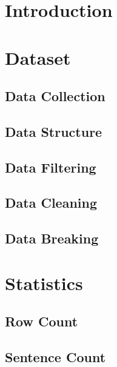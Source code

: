 \section{Introduction}

\section{Dataset}

\subsection{Data Collection}

\subsection{Data Structure}

\subsection{Data Filtering}

\subsection{Data Cleaning}

\subsection{Data Breaking}

\section{Statistics}


\subsection{Row Count}
\begin{adjustbox}{max width=\textwidth}
\end{adjustbox}

\subsection{Sentence Count}
\begin{adjustbox}{max width=\textwidth}
\end{adjustbox}

